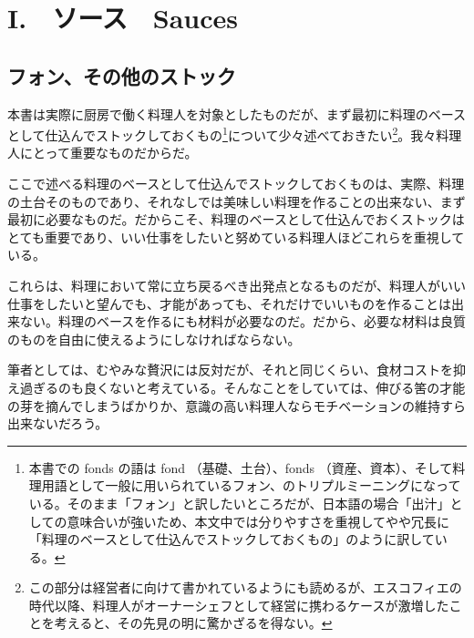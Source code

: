 \href{未、オスマゾームなどについての補足、カレームとの比較}{}
\href{未、原文対照チェック}{} \href{未、日本語表現校正}{}
\href{未、その他修正}{} \href{未、原稿最終校正}{}
\begin{description}
\hypertarget{sauces}{%
\chapter{I.　ソース　Sauces}\label{sauces}}

\hypertarget{les-fonds-de-cuisine}{%
\section{フォン、その他のストック}\label{les-fonds-de-cuisine}}


 

\normalsize
{}

本書は実際に厨房で働く料理人を対象としたものだが、まず最初に料理のベースとして仕込んでストックしておくもの\footnote{本書での
  fonds の語は fond （基礎、土台）、fonds
  （資産、資本）、そして料理用語として一般に用いられているフォン、のトリプルミーニングになっている。そのまま「フォン」と訳したいところだが、日本語の場合「出汁」としての意味合いが強いため、本文中では分りやすさを重視してやや冗長に「料理のベースとして仕込んでストックしておくもの」のように訳している。}について少々述べておきたい\footnote{この部分は経営者に向けて書かれているようにも読めるが、エスコフィエの時代以降、料理人がオーナーシェフとして経営に携わるケースが激増したことを考えると、その先見の明に驚かざるを得ない。}。我々料理人にとって重要なものだからだ。

ここで述べる料理のベースとして仕込んでストックしておくものは、実際、料理の土台そのものであり、それなしでは美味しい料理を作ることの出来ない、まず最初に必要なものだ。だからこそ、料理のベースとして仕込んでおくストックはとても重要であり、いい仕事をしたいと努めている料理人ほどこれらを重視している。

これらは、料理において常に立ち戻るべき出発点となるものだが、料理人がいい仕事をしたいと望んでも、才能があっても、それだけでいいものを作ることは出来ない。料理のベースを作るにも材料が必要なのだ。だから、必要な材料は良質のものを自由に使えるようにしなければならない。

筆者としては、むやみな贅沢には反対だが、それと同じくらい、食材コストを抑え過ぎるのも良くないと考えている。そんなことをしていては、伸びる筈の才能の芽を摘んでしまうばかりか、意識の高い料理人ならモチベーションの維持すら出来ないだろう。


\end{description}

